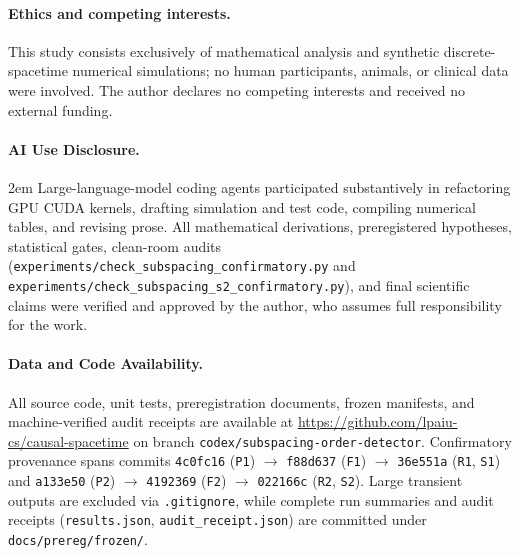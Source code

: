 \documentclass[11pt,a4paper]{article}
\begin{document}
\paragraph{Ethics and competing interests.}
This study consists exclusively of mathematical analysis and synthetic discrete-spacetime
numerical simulations; no human participants, animals, or clinical data were involved.
The author declares no competing interests and received no external funding.

\paragraph{AI Use Disclosure.}
{\emergencystretch 2em
Large-language-model coding agents participated substantively in refactoring GPU CUDA
kernels, drafting simulation and test code, compiling numerical tables, and revising prose.
All mathematical derivations, preregistered hypotheses, statistical gates, clean-room
audits (\nolinkurl{experiments/check_subspacing_confirmatory.py} and
\nolinkurl{experiments/check_subspacing_s2_confirmatory.py}), and final scientific claims
were verified and approved by the author, who assumes full responsibility for the work.\par}

\paragraph{Data and Code Availability.}
All source code, unit tests, preregistration documents, frozen manifests, and machine-verified
audit receipts are available at \url{https://github.com/lpaiu-cs/causal-spacetime} on branch
\texttt{codex/subspacing-order-detector}. Confirmatory provenance spans commits \texttt{4c0fc16}
(\texttt{P1}) $\to$ \texttt{f88d637} (\texttt{F1}) $\to$ \texttt{36e551a} (\texttt{R1}, \texttt{S1}) and
\texttt{a133e50} (\texttt{P2}) $\to$ \texttt{4192369} (\texttt{F2}) $\to$ \texttt{022166c} (\texttt{R2}, \texttt{S2}).
Large transient outputs are excluded via \texttt{.gitignore}, while complete run summaries and audit
receipts (\texttt{results.json}, \texttt{audit\_receipt.json}) are committed under \nolinkurl{docs/prereg/frozen/}.
\end{document}
